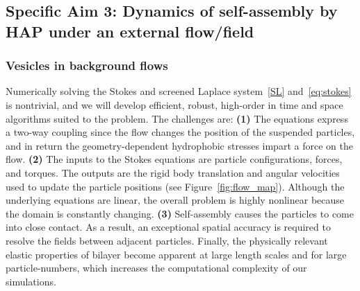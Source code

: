 \subsection{Specific Aim 3: Dynamics of self-assembly by HAP under an external flow/field}
\label{subsec:specific_aim_3}

\subsubsection{Vesicles in background flows}
Numerically solving the Stokes and screened Laplace system~\eqref{SL}
and~\eqref{eq:stokes} is nontrivial, and we will develop efficient,
robust, high-order in time and space algorithms suited to the problem.
The challenges are: {\bf (1)} The equations express a two-way coupling
since the flow changes the position of the suspended particles,
and in return the geometry-dependent hydrophobic stresses impart a force
on the flow. {\bf (2)} The inputs to the Stokes equations are particle
configurations, forces, and torques. The outputs are the rigid body
translation and angular velocities used to update the particle positions
(see Figure~\ref{fig:flow_map}). Although the underlying equations are
linear, the overall problem is highly nonlinear because the domain is
constantly changing. {\bf (3)} Self-assembly causes the particles to
come into close contact. As a result, an exceptional spatial accuracy is
required to resolve the fields between adjacent particles. Finally, the
physically relevant elastic properties of bilayer become apparent at
large length scales and for large particle-numbers, which increases the
computational complexity of our simulations. 

